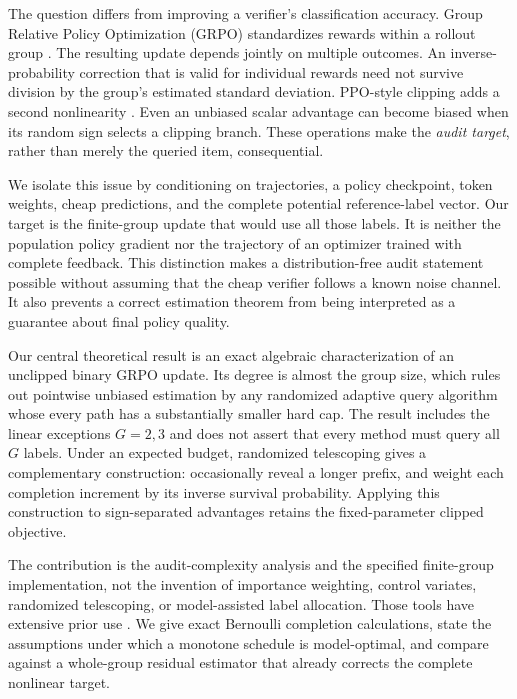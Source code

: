 \documentclass[11pt]{article}
\begin{document}
The question differs from improving a verifier's classification accuracy. Group Relative Policy Optimization (GRPO) standardizes rewards within a rollout group \citep{shao2024}. The resulting update depends jointly on multiple outcomes. An inverse-probability correction that is valid for individual rewards need not survive division by the group's estimated standard deviation. PPO-style clipping adds a second nonlinearity \citep{schulman2017}. Even an unbiased scalar advantage can become biased when its random sign selects a clipping branch. These operations make the \emph{audit target}, rather than merely the queried item, consequential.

We isolate this issue by conditioning on trajectories, a policy checkpoint, token weights, cheap predictions, and the complete potential reference-label vector. Our target is the finite-group update that would use all those labels. It is neither the population policy gradient nor the trajectory of an optimizer trained with complete feedback. This distinction makes a distribution-free audit statement possible without assuming that the cheap verifier follows a known noise channel. It also prevents a correct estimation theorem from being interpreted as a guarantee about final policy quality.

Our central theoretical result is an exact algebraic characterization of an unclipped binary GRPO update. Its degree is almost the group size, which rules out pointwise unbiased estimation by any randomized adaptive query algorithm whose every path has a substantially smaller hard cap. The result includes the linear exceptions $G=2,3$ and does not assert that every method must query all $G$ labels. Under an expected budget, randomized telescoping \citep{rhee2015,beatson2019} gives a complementary construction: occasionally reveal a longer prefix, and weight each completion increment by its inverse survival probability. Applying this construction to sign-separated advantages retains the fixed-parameter clipped objective.

The contribution is the audit-complexity analysis and the specified finite-group implementation, not the invention of importance weighting, control variates, randomized telescoping, or model-assisted label allocation. Those tools have extensive prior use \citep{horvitz1952,zrnic2024,liu2026}. We give exact Bernoulli completion calculations, state the assumptions under which a monotone schedule is model-optimal, and compare against a whole-group residual estimator that already corrects the complete nonlinear target.
\end{document}
